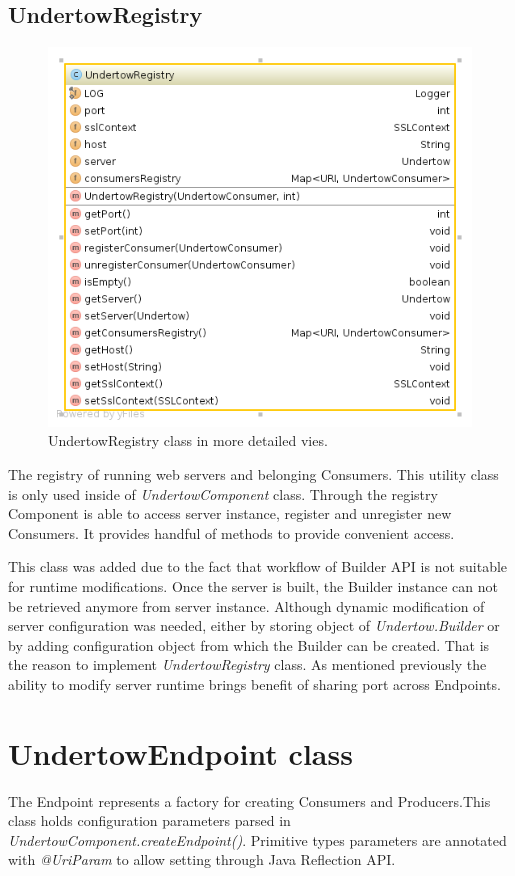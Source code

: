 \documentclass[12pt,final,oneside]{fithesis2}
\begin{document}
\subsection{UndertowRegistry}
 \begin{figure}[!h]
\centering
\includegraphics[width=0.6\linewidth]{images/undertowRegistry.png}
\caption{UndertowRegistry class in more detailed vies.}
\end{figure} 

The registry of running web servers and belonging Consumers. This utility class is only used inside of \textit{UndertowComponent} class. Through the registry Component is able to access server instance, register and unregister new Consumers. It provides handful of methods to provide convenient access.

This class was added due to the fact that workflow of Builder API is not suitable for runtime modifications. Once the server is built, the Builder instance can not be retrieved anymore from server instance. Although dynamic modification of server configuration was needed, either by storing object of \textit{Undertow.Builder} or by adding configuration object from which the Builder can be created. That is the reason to implement \textit{UndertowRegistry} class. As mentioned previously the ability to modify server runtime brings benefit of sharing port across Endpoints. 

\section{UndertowEndpoint class}

The Endpoint represents a factory for creating Consumers and Producers.This class holds configuration parameters parsed in \textit{UndertowComponent.createEndpoint()}. Primitive types parameters are annotated with \textit{@UriParam} to allow setting through Java Reflection API. 
\end{document}
